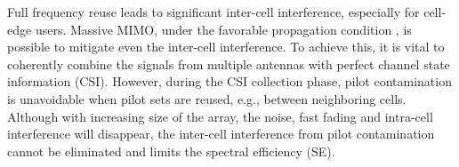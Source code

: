 Full frequency reuse leads to significant inter-cell interference, especially for cell-edge users. Massive MIMO, under the favorable propagation condition \cite{ngo2014aspects}, is possible to mitigate even the inter-cell interference. %
To achieve this, it is vital to coherently combine the signals from multiple antennas with perfect channel state information (CSI). However, during the CSI collection phase, pilot contamination is unavoidable when pilot sets are reused, e.g., between neighboring cells. Although with increasing size of the array, the %
noise, fast fading and intra-cell interference will disappear, %
the inter-cell interference from pilot contamination cannot be eliminated and limits the spectral efficiency (SE)\cite{marzetta2010noncooperative,bjornson2017massive,jose2011pilot}.

